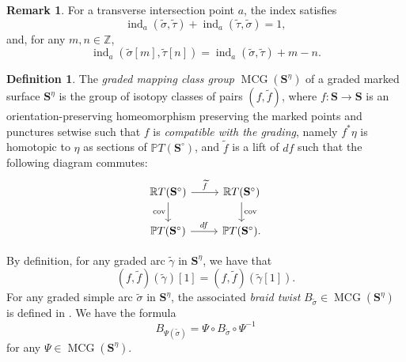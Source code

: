 \documentclass[11pt,a4paper,reqno]{amsart}%
\theoremstyle{plain}
\theoremstyle{definition}
\newtheorem{definition}[definition]{Definition}
\newtheorem{remark}[remark]{Remark}
\numberwithin{equation}{section}
\numberwithin{equation}{section}
\def\ZZ{\mathbb{Z}}
\def\surf{\mathbf{S}} %
\def\surfi{\surf^\circ}
\newcommand{\gind}{\operatorname{ind}\nolimits}
\def\grad{\eta}
\newcommand{\MCG}{\operatorname{MCG}}
\newcommand{\gms}{\surf^\grad}
\def\surf{\mathbf{S}}                       %
\begin{document}
\begin{remark}\label{rem:gind}
For a transverse intersection point $a$, the index satisfies
\begin{equation}\label{eq:gind-sym}
\gind_a(\widetilde{\sigma},\widetilde{\tau})+\gind_a(\widetilde{\tau},\widetilde{\sigma})=1,
\end{equation}
and, for any $m,n\in\ZZ$,
\begin{equation}\label{eq:gind-shift}
\gind_a(\widetilde{\sigma}[m],\widetilde{\tau}[n])=\gind_a(\widetilde{\sigma},\widetilde{\tau})+m-n.
\end{equation}
\end{remark}

\begin{definition}\label{def:mcgofgms}
The \emph{graded mapping class group} $\MCG(\gms)$ of a graded marked surface $\gms$ is the group of isotopy classes of pairs $(f,\widetilde f)$, where $f\colon \surf \to \surf$ is an orientation-preserving homeomorphism preserving the marked points and punctures setwise such that $f$ is \emph{compatible with the grading}, namely $f^*\eta$ is homotopic to $\eta$ as sections of $\mathbb{P}T(\surfi)$, and $\widetilde f$ is a lift of $df$ such that the following diagram commutes:
\begin{equation}\label{eq:cov}
\begin{tikzcd}
\mathbb{R}T(\surfi) \arrow[r, "\widetilde f"] \arrow[d, "\operatorname{cov}"']
& \mathbb{R}T(\surfi) \arrow[d, "\operatorname{cov}"] \\
\mathbb{P}T(\surfi) \arrow[r, "df"]
& \mathbb{P}T(\surfi) .
\end{tikzcd}
\end{equation}
\end{definition}
By definition, for any graded arc $\widetilde{\gamma}$ in $\gms$, we have that
\[(f,\widetilde f)(\widetilde{\gamma})[1]=(f,\widetilde f)(\widetilde{\gamma}[1]).\]
For any graded simple arc $\widetilde{\sigma}$ in $\gms$, the associated \emph{braid twist} $B_{\widetilde{\sigma}}\in\MCG(\gms)$ is defined in . We have the formula
\begin{equation}\label{eq:bt}
B_{\Psi(\widetilde{\sigma})}=\Psi\circ B_{\widetilde{\sigma}}\circ\Psi^{-1}
\end{equation}
for any $\Psi\in\MCG(\gms)$. 
\end{document}
